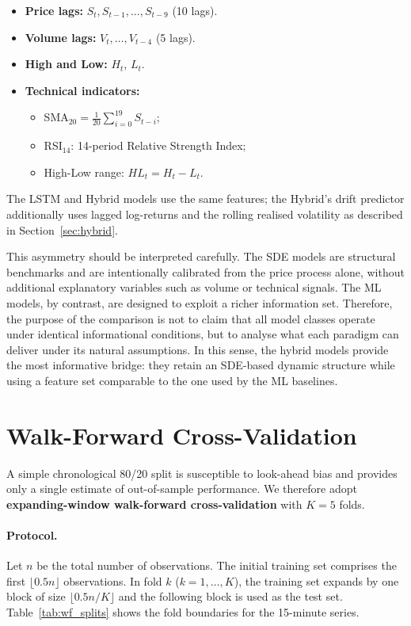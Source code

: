 \documentclass[12pt, a4paper, oneside]{report}
\theoremstyle{plain}
\theoremstyle{definition}
\theoremstyle{remark}
\begin{document}
\begin{itemize}[leftmargin=1.25cm]
  \item \textbf{Price lags:} $S_t, S_{t-1}, \ldots, S_{t-9}$ (10 lags).
  \item \textbf{Volume lags:} $V_t, \ldots, V_{t-4}$ (5 lags).
  \item \textbf{High and Low:} $H_t$, $L_t$.
  \item \textbf{Technical indicators:}
    \begin{itemize}[leftmargin=1.25cm]
      \item SMA$_{20} = \frac{1}{20}\sum_{i=0}^{19}S_{t-i}$;
      \item RSI$_{14}$: 14-period Relative Strength Index;
      \item High-Low range: $HL_t = H_t - L_t$.
    \end{itemize}
\end{itemize}

The LSTM and Hybrid models use the same features; the Hybrid's drift predictor
additionally uses lagged log-returns and the rolling realised volatility as
described in Section~\ref{sec:hybrid}.

This asymmetry should be interpreted carefully.  The SDE models are structural
benchmarks and are intentionally calibrated from the price process alone,
without additional explanatory variables such as volume or technical signals.
The ML models, by contrast, are designed to exploit a richer information set.
Therefore, the purpose of the comparison is not to claim that all model classes
operate under identical informational conditions, but to analyse what each
paradigm can deliver under its natural assumptions.  In this sense, the hybrid
models provide the most informative bridge: they retain an SDE-based dynamic
structure while using a feature set comparable to the one used by the ML
baselines.

\section{Walk-Forward Cross-Validation}
\label{sec:wfcv}

A simple chronological 80/20 split is susceptible to look-ahead bias and
provides only a single estimate of out-of-sample performance.  We therefore
adopt \textbf{expanding-window walk-forward cross-validation} with $K = 5$
folds.

\paragraph{Protocol.}
Let $n$ be the total number of observations.  The initial training set
comprises the first $\lfloor 0.5 n \rfloor$ observations.  In fold $k$
($k = 1, \ldots, K$), the training set expands by one block of size
$\lfloor 0.5n / K \rfloor$ and the following block is used as the test set.
Table~\ref{tab:wf_splits} shows the fold boundaries for the 15-minute series.
\end{document}

